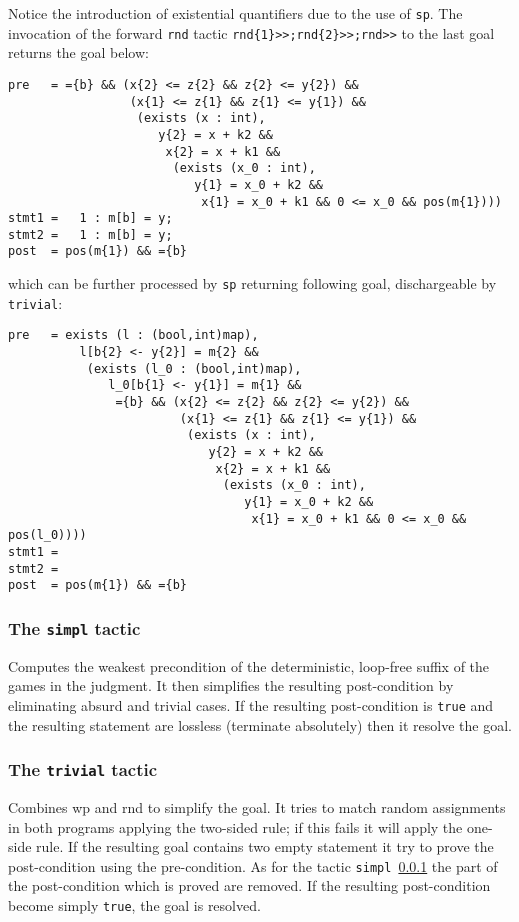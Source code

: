 \noindent
Notice the introduction of existential quantifiers due to the use of
\verb+sp+. The invocation of the forward \verb+rnd+ tactic
\verb+rnd{1}>>;rnd{2}>>;rnd>>+ to the last goal returns the goal
below:
\begin{verbatim}
pre   = ={b} && (x{2} <= z{2} && z{2} <= y{2}) &&
                 (x{1} <= z{1} && z{1} <= y{1}) &&
                  (exists (x : int),
                     y{2} = x + k2 &&
                      x{2} = x + k1 &&
                       (exists (x_0 : int),
                          y{1} = x_0 + k2 &&
                           x{1} = x_0 + k1 && 0 <= x_0 && pos(m{1})))
stmt1 =   1 : m[b] = y;
stmt2 =   1 : m[b] = y;
post  = pos(m{1}) && ={b}
\end{verbatim}
\noindent
which can be further processed by \verb+sp+ returning following goal,
dischargeable by \verb+trivial+:
\begin{verbatim}
pre   = exists (l : (bool,int)map),
          l[b{2} <- y{2}] = m{2} &&
           (exists (l_0 : (bool,int)map),
              l_0[b{1} <- y{1}] = m{1} &&
               ={b} && (x{2} <= z{2} && z{2} <= y{2}) &&
                        (x{1} <= z{1} && z{1} <= y{1}) &&
                         (exists (x : int),
                            y{2} = x + k2 &&
                             x{2} = x + k1 &&
                              (exists (x_0 : int),
                                 y{1} = x_0 + k2 &&
                                  x{1} = x_0 + k1 && 0 <= x_0 && pos(l_0))))
stmt1 = 
stmt2 = 
post  = pos(m{1}) && ={b}
\end{verbatim}

\subsubsection{The \texttt{simpl} tactic}\label{tac:simpl}
%
  Computes the weakest precondition of the deterministic, loop-free
  suffix of the games in the judgment. It then simplifies the
  resulting post-condition by eliminating absurd and trivial cases.
  If the resulting post-condition is \verb+true+ and the resulting
  statement are lossless (terminate absolutely) then it resolve the goal.

\subsubsection{The \texttt{trivial} tactic}\label{tac:trivial}
%
  Combines wp and rnd to simplify the goal. It tries to match random
  assignments in both programs applying the two-sided rule; if this
  fails it will apply the one-side rule. If the resulting goal contains two
  empty statement it try to prove the post-condition using the pre-condition.
  As for the tactic \verb+simpl+~\ref{tac:simpl} the part of the post-condition which is proved are 
  removed. If the resulting post-condition become simply \verb+true+, the
  goal is resolved.

